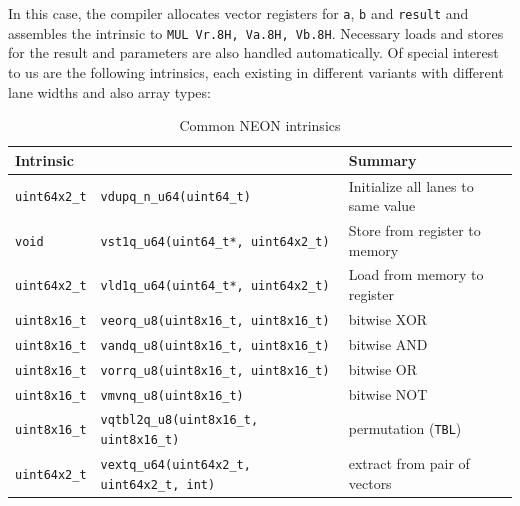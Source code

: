 In this case, the compiler allocates vector registers for \texttt{a},
\texttt{b} and \texttt{result} and assembles the intrinsic to \texttt{MUL
Vr.8H, Va.8H, Vb.8H}. Necessary loads and stores for the result and parameters
are also handled automatically. Of special interest to us are the following
intrinsics, each existing in different variants with different lane widths and
also array types: \\

\begin{table}[h!]
    \centering
    \scriptsize
    \caption{Common NEON intrinsics}
    \begin{tabularx}{\textwidth}{llX}
        \toprule
        Intrinsic && Summary \\
        \midrule
        \texttt{uint64x2\_t} & \texttt{vdupq\_n\_u64(uint64\_t)} & Initialize all lanes to same value \\
        \midrule
        \texttt{void} & \texttt{vst1q\_u64(uint64\_t*, uint64x2\_t)} & Store from register to memory \\
        \midrule
        \texttt{uint64x2\_t} & \texttt{vld1q\_u64(uint64\_t*, uint64x2\_t)} & Load from memory to register \\
        \midrule
        \texttt{uint8x16\_t} & \texttt{veorq\_u8(uint8x16\_t, uint8x16\_t)} & bitwise XOR \\
        \midrule
        \texttt{uint8x16\_t} & \texttt{vandq\_u8(uint8x16\_t, uint8x16\_t)} & bitwise AND \\
        \midrule
        \texttt{uint8x16\_t} & \texttt{vorrq\_u8(uint8x16\_t, uint8x16\_t)} & bitwise OR \\
        \midrule
        \texttt{uint8x16\_t} & \texttt{vmvnq\_u8(uint8x16\_t)} & bitwise NOT \\
        \midrule
        \texttt{uint8x16\_t} & \texttt{vqtbl2q\_u8(uint8x16\_t, uint8x16\_t)} & permutation (\texttt{TBL}) \\
        \midrule
        \texttt{uint64x2\_t} & \texttt{vextq\_u64(uint64x2\_t, uint64x2\_t, int)} & extract from pair of vectors \\
        \bottomrule
    \end{tabularx}
\end{table}
